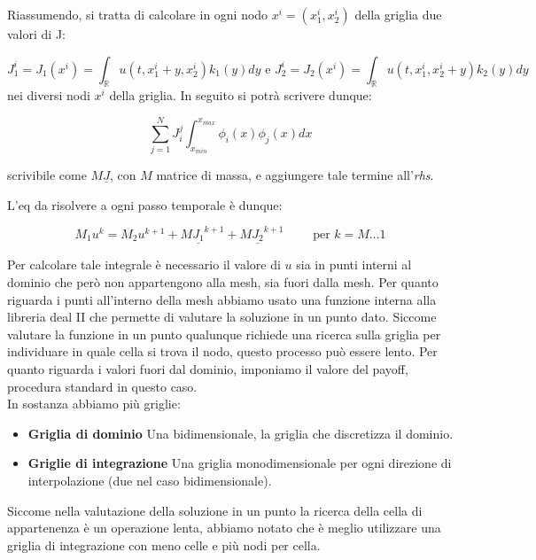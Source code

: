 \documentclass[a4paper,10pt]{article}
\begin{document}
Riassumendo, si tratta di calcolare in ogni nodo $x^i=(x_1^i,x_2^i)$ della griglia due valori di J: 

\begin{equation*}
 J_1^i=J_1(x^i)=\int_\mathbb{R}u(t,x_1^i+y,x_2^i)k_1(y)dy \text{ e } J_2^i=J_2(x^i)=\int_\mathbb{R}u(t,x_1^i,x_2^i+y)k_2(y)dy
\end{equation*}
nei diversi nodi $x^i$ della griglia. In seguito si potrà scrivere dunque:

\begin{equation*}
 \sum_{j=1}^N J_i^j\int_{x_{min}}^{x_{max}} \phi_i(x)\phi_j(x)dx
\end{equation*}

scrivibile come $M\underline{J}$, con $M$ matrice di massa, e aggiungere tale termine all'\emph{rhs}.

L'eq da risolvere a ogni passo temporale è dunque:

\begin{equation*}
 M_1u^k=M_2u^{k+1}+M\underline{J_1}^{k+1}+M\underline{J_2}^{k+1}  \qquad \text{ per } k=M\dots1
\end{equation*}


Per calcolare tale integrale è necessario il valore di $u$ sia in punti interni al dominio che per\`o non appartengono alla mesh, sia fuori dalla mesh. Per quanto riguarda i punti all'interno della mesh abbiamo usato una funzione interna alla libreria deal II che permette di valutare la soluzione in un punto dato. Siccome valutare la funzione in un punto qualunque richiede una ricerca sulla griglia per individuare in quale cella si trova il nodo, questo processo può essere lento. Per quanto riguarda i valori fuori dal dominio, imponiamo il valore del payoff, procedura standard in questo caso.\\

In sostanza abbiamo più griglie:
\begin{itemize}
 \item \textbf{Griglia di dominio} Una bidimensionale, la griglia che discretizza il dominio.
 \item \textbf{Griglie di integrazione} Una griglia monodimensionale per ogni direzione di interpolazione (due nel caso bidimensionale).
\end{itemize}

Siccome nella valutazione della soluzione in un punto la ricerca della cella di appartenenza è un operazione lenta, abbiamo notato che è meglio utilizzare una griglia di integrazione con meno celle e più nodi per cella.
\end{document}
